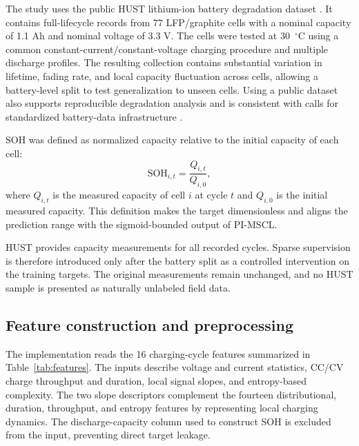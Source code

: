 \documentclass[pdflatex,sn-mathphys-num]{sn-jnl}
\begin{document}
The study uses the public HUST lithium-ion battery degradation dataset \cite{Yuan2022HUSTDataset}. It contains full-lifecycle records from 77 LFP/graphite cells with a nominal capacity of 1.1 Ah and nominal voltage of 3.3 V. The cells were tested at 30~$^{\circ}$C using a common constant-current/constant-voltage charging procedure and multiple discharge profiles. The resulting collection contains substantial variation in lifetime, fading rate, and local capacity fluctuation across cells, allowing a battery-level split to test generalization to unseen cells. Using a public dataset also supports reproducible degradation analysis and is consistent with calls for standardized battery-data infrastructure \cite{ward2022principles}.

SOH was defined as normalized capacity relative to the initial capacity of each cell:
\begin{equation}
\mathrm{SOH}_{i,t}=\frac{Q_{i,t}}{Q_{i,0}},
\label{eq:soh_definition}
\end{equation}
where $Q_{i,t}$ is the measured capacity of cell $i$ at cycle $t$ and $Q_{i,0}$ is the initial measured capacity. This definition makes the target dimensionless and aligns the prediction range with the sigmoid-bounded output of PI-MSCL.

HUST provides capacity measurements for all recorded cycles. Sparse supervision is therefore introduced only after the battery split as a controlled intervention on the training targets. The original measurements remain unchanged, and no HUST sample is presented as naturally unlabeled field data.

\subsection{Feature construction and preprocessing}
\label{subsec:features_preprocessing}

The implementation reads the 16 charging-cycle features summarized in Table~\ref{tab:features}. The inputs describe voltage and current statistics, CC/CV charge throughput and duration, local signal slopes, and entropy-based complexity. The two slope descriptors complement the fourteen distributional, duration, throughput, and entropy features by representing local charging dynamics. The discharge-capacity column used to construct SOH is excluded from the input, preventing direct target leakage.
\end{document}
